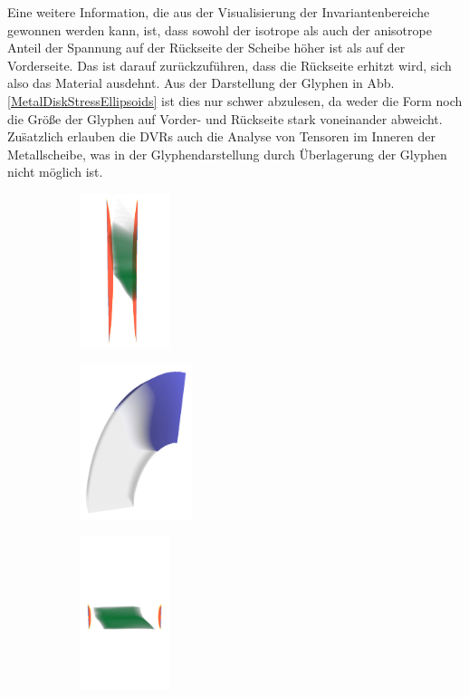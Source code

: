 \documentclass[a4paper,fontsize=12pt,toc=bib,halfparskip]{scrartcl}
\begin{document}
Eine weitere Information, die aus der Visualisierung der Invariantenbereiche gewonnen werden kann, ist, dass sowohl der isotrope als auch der anisotrope Anteil der Spannung auf der R\"uckseite der Scheibe h\"oher ist als auf der Vorderseite. Das ist darauf zur\"uckzuf\"uhren, dass die R\"uckseite erhitzt wird, sich also das Material ausdehnt. Aus der Darstellung der Glyphen in Abb. \ref{MetalDiskStressEllipsoids} ist dies nur schwer abzulesen, da weder die Form noch die Gr\"o{\ss}e der Glyphen auf Vorder- und R\"uckseite stark voneinander abweicht. Zu\"satzlich erlauben die DVRs auch die Analyse von Tensoren im Inneren der Metallscheibe, was in der Glyphendarstellung durch \"Uberlagerung der Glyphen nicht m\"oglich ist.

\begin{figure}
	\begin{subfigure}{0.49\textwidth}
		\centering
		\includegraphics[height=4.5cm]{pictures/results/MetalDiskStress_InvariantSpace1.png}
		\subcaption{}
		\label{MetalDiskStressInvariant1}
	\end{subfigure}
	\hspace*{\fill}
	\begin{subfigure}{0.49\textwidth}
		\centering
		\includegraphics[height=4.5cm]{pictures/results/MetalDiskStress_Object1.png}
		\subcaption{}
		\label{MetalDiskStressObject1}
	\end{subfigure}
	\medskip
	\begin{subfigure}{0.49\textwidth}
		\centering
		\includegraphics[height=4.5cm]{pictures/results/MetalDiskStress_InvariantSpace2.png}

\end{subfigure}
\end{figure}
\end{document}

